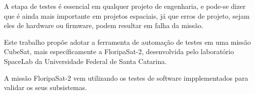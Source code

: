A etapa de testes é essencial em qualquer projeto de engenharia, e pode-se dizer que é ainda mais importante em projetos espaciais, já
que erros de projeto, sejam eles de hardware ou firmware, podem resultar em falha da missão.

Este trabalho propõe adotar a ferramenta de automação de testes em uma missão CubeSat, mais específicamente a FloripaSat-2, desenvolvida
pelo laboratório SpaceLab da Universidade Federal de Santa Catarina.

A missão FloripaSat-2 vem utilizando os testes de software impplementados para validar os seus subsistemas.
